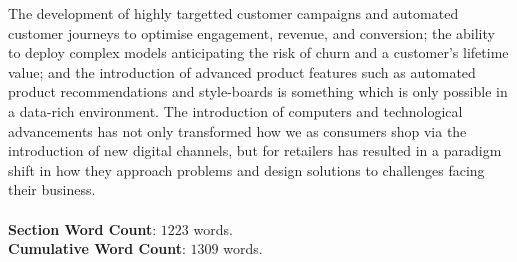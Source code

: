 \documentclass[11pt]{article}
\theoremstyle{plain}
\theoremstyle{definition}
\begin{document}
The development of highly targetted customer campaigns and automated customer journeys to optimise engagement, revenue, and conversion; the ability to deploy complex models anticipating the risk of churn and a customer's lifetime value; and the introduction of advanced product features such as automated product recommendations and style-boards is something which is only possible in a data-rich environment. The introduction of computers and technological advancements has not only transformed how we as consumers shop via the introduction of new digital channels, but for retailers has resulted in a paradigm shift in how they approach problems and design solutions to challenges facing their business.\\
\\
\textbf{Section Word Count}: $1223$ words.\\
\textbf{Cumulative Word Count}: $1309$ words.

\pagebreak
\end{document}
